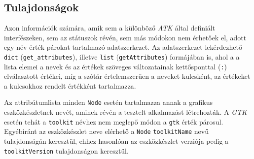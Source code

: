 \subsection{Tulajdonságok}

Azon információk számára, amik sem a különböző \textit{ATK} által definiált interfészeken, sem az státuszok révén, sem más módokon nem érhetőek el, adott egy név érték párokat tartalmazó adatszerkezet. Az adatszerkezet lekérdezhető \texttt{dict} (\texttt{get\_attributes}), illetve \texttt{list} (\texttt{getAttributes}) formájában is, ahol a a lista elemei a nevek és az értékek szöveges változatainak kettősponttal (\texttt{:}) elválasztott értékei, míg a szótár értelemszerűen a neveket kulcsként, az értékeket a kulcsokhoz rendelt értékként tartalmazza.

Az attribútumlista minden \texttt{Node} esetén tartalmazza annak a grafikus eszközkészletnek nevét, aminek révén a tesztelt alkalmazást létrehozták. A \textit{GTK} esetén tehát a \texttt{toolkit} névhez nem meglepő módon a \texttt{gtk} érték párosul. Egyébiránt az eszközkészlet neve elérhető a \texttt{Node} \texttt{toolkitName} nevű tulajdonságán keresztül, ehhez hasonlóan az eszközkészlet verziója pedig a \texttt{toolkitVersion} tulajdonságon keresztül.
